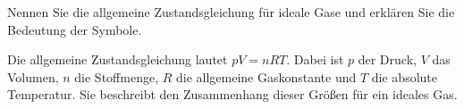 \begin{exercise}[subtitle=Zustandsgleichungen, points=1, Punkt=1]
Nennen Sie die allgemeine Zustandsgleichung für ideale Gase und erklären Sie die Bedeutung der Symbole.
\begin{solution}
Die allgemeine Zustandsgleichung lautet \( pV = nRT \). Dabei ist \( p \) der Druck, \( V \) das Volumen, \( n \) die Stoffmenge, \( R \) die allgemeine Gaskonstante und \( T \) die absolute Temperatur. Sie beschreibt den Zusammenhang dieser Größen für ein ideales Gas.
\end{solution}
\end{exercise}
